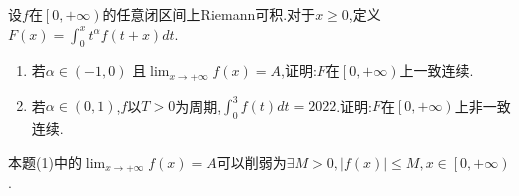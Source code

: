 \documentclass[lang=cn,newtx,10pt,scheme=chinese]{elegantbook}
\begin{document}
\begin{example}
设$f$在$\left[ 0,+\infty \right)$的任意闭区间上Riemann可积.对于$x\geqslant 0$,定义$F\left( x \right) =\int_0^x{t^{\alpha}}f\left( t+x \right) dt$.
\begin{enumerate}[(1)]
\item 若$\alpha \in \left( -1,0 \right)$ 且$\lim_{x\rightarrow +\infty} f\left( x \right) =A$,证明:$F$在$\left[ 0,+\infty \right) $上一致连续.

\item 若$\alpha \in \left( 0,1 \right)$,$f$以$T>0$为周期,$\int_0^3{f\left( t \right) dt}=2022$.证明:$F$在$\left[ 0,+\infty \right) $上非一致连续.
\end{enumerate}
\end{example}
\begin{note}
本题(1)中的$\lim_{x\rightarrow +\infty} f\left( x \right) =A$可以削弱为$\exists M>0,\left| f\left( x \right) \right|\leqslant M,x\in \left[ 0,+\infty \right) $.
\end{note}
\end{document}
